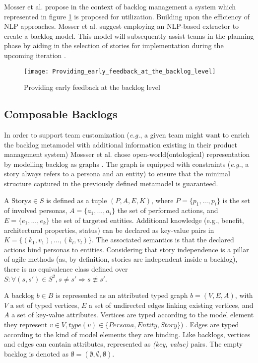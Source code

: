 Mosser et al. propose in the context of backlog management a system which represented in figure \ref{fig:early_feedback} is proposed for utilization. Building upon the efficiency of NLP approaches. Mosser et al. suggest employing an NLP-based extractor to create a backlog model. This model will subsequently assist teams in the planning phase by aiding in the selection of stories for implementation during the upcoming iteration \cite{mosser2022modelling}.
\begin{figure}
\center
\texttt{[image: Providing\_early\_feedback\_at\_the\_backlog\_level]}
\caption{Providing early feedback at the backlog level \cite{mosser2022modelling}}\label{fig:early_feedback}
\end{figure}
\subsection*{Composable Backlogs}
In order to support team customization (\emph{e.g.}, a given team might want to enrich the backlog metamodel with additional information existing in their product management system) Mossser et al. chose open-world(ontological) representation by modelling backlog as graphs \cite{mosser2022modelling}. The graph is equipped with constraints (\emph{e.g.}, a story always refers to a persona and an entity) to ensure that the minimal structure captured in the previously deﬁned metamodel is guaranteed.
\begin{definition}
A Story$s \in S$ is defined as a tuple $\left(P,A,E,K\right)$, where $P=\{p_1, ..., p_i\}$ is the set of involved personas, $A= \{a_1, ..., a_i\}$ the set of performed actions, and $E = \{e_1, ..., e_k\}$ the set of targeted entities. Additional knowledge (e.g., benefit, architectural properties, status) can be declared as key-value pairs in $K = \{(k_1,v_1), ..., (k_l,v_l)\}$. The associated semantics is that the declared actions bind personas to entities. Considering that story independence is a pillar of agile methods (as, by definition, stories are independent inside a backlog), there is no equivalence class deﬁned over \\
$S: \forall (s,s')\in S^2, s\neq s' \Rightarrow s \not \equiv s'$.
\end{definition}
\begin{definition}
A backlog $b \in B$ is represented as an attributed typed graph $b = (V, E, A)$, with $V$ a set of typed vertices, $E$ a set of undirected edges linking existing vertices, and $A$ a set of key-value attributes. Vertices are typed according to the model element they represent $v \in V, type(v) \in \{ Persona, Entity, Story \} )$ . Edges are typed according to the kind of model elements they are binding. Like backlogs, vertices and edges can contain attributes, represented as \emph{(key, value)} pairs. The empty backlog is denoted as $\emptyset = (\emptyset ,\emptyset ,\emptyset )$.
\end{definition}
